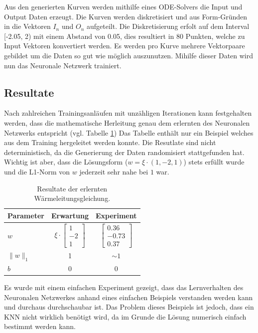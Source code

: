 Aus den generierten Kurven werden mithilfe eines ODE-Solvers die Input und Output Daten erzeugt. Die Kurven werden diskretisiert und aus Form-Gründen in die Vektoren $I_n$ und $O_n$ aufgeteilt. Die Diskretisierung erfolt auf dem Interval [-2.05, 2) mit einem Abstand von 0.05, dies resultiert in 80 Punkten, welche zu Input Vektoren konvertiert werden. Es werden pro Kurve mehrere Vektorpaare gebildet um die Daten so gut wie möglich auszunutzen. Mihilfe dieser Daten wird nun das Neuronale Netzwerk trainiert.

\subsection{Resultate}
Nach zahlreichen Trainingsanläufen mit unzähligen Iterationen kann festgehalten werden, dass die mathematische Herleitung genau dem erlernten des Neuronalen Netzwerks entspricht (vgl. Tabelle \ref{tbl:result_heat}) Das Tabelle enthält nur ein Beispiel welches aus dem Training hergeleitet werden konnte. Die Resutlate sind nicht deterministisch, da die Generierung der Daten randomisiert stattgefunden hat. Wichtig ist aber, dass die Lösungsform ($w = \xi \cdot (1, -2, 1)$) stets erfüllt wurde und die L1-Norm von $w$ jederzeit sehr nahe bei $1$ war.

\begin{table}[h]
	\centering
	\def\arraystretch{1.1}
	\begin{tabular}{l|c|c}
		Parameter & Erwartung & Experiment \\
		\hline
		$w$ & $\xi \cdot \begin{bmatrix} 1 \\ -2 \\ 1 \end{bmatrix}$ & $\begin{bmatrix} 0.36 \\ -0.73 \\ 0.37 \end{bmatrix}$ \\
		$\|w\|_{1}$ & 1 & $\sim 1$ \\
		$b$ & 0 & 0 \\
	\end{tabular}
	\label{tbl:result_heat}
	\caption{Resultate der erlernten Wärmeleitungsgleichung.}
\end{table}

Es wurde mit einem einfachen Experiment gezeigt, dass das Lernverhalten des Neuronalen Netzwerkes anhand eines einfachen Beispiels verstanden werden kann und durchaus durchschaubar ist. Das Problem dieses Beispiels ist jedoch, dass ein KNN nicht wirklich benötigt wird, da im Grunde die Lösung numerisch einfach bestimmt werden kann.